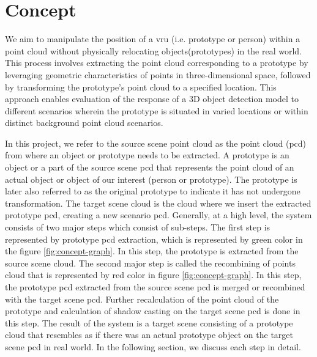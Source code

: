 \chapter{Concept}

We aim to manipulate the position of a \acrshort{vru} (i.e. prototype or person) within a point cloud without physically relocating objects(prototypes) in the real world. This process involves extracting the point cloud corresponding to a prototype by leveraging geometric characteristics of points in three-dimensional space, followed by transforming the prototype's point cloud to a specified location. This approach enables evaluation of the response of a 3D object detection model to different scenarios wherein the prototype is situated in varied locations or within distinct background point cloud scenarios.

In this project, we refer to the source scene point cloud as the point cloud (\acrshort{pcd}) from where an object or prototype needs to be extracted. A prototype is an object or a part of the source scene \acrshort{pcd} that represents the point cloud of an actual object or object of our interest (person or prototype). The prototype is later also referred to as the original prototype to indicate it has not undergone transformation. The target scene cloud is the cloud where we insert the extracted prototype \acrshort{pcd}, creating a new scenario \acrshort{pcd}. Generally, at a high level, the system consists of two major steps which consist of sub-steps. The first step is represented by prototype \acrshort{pcd} extraction, which is represented by green color in the figure \ref{fig:concept-graph}. In this step, the prototype is extracted from the source scene cloud. The second major step is called the recombining of points cloud that is represented by red color in figure \ref{fig:concept-graph}. In this step, the prototype \acrshort{pcd} extracted from the source scene \acrshort{pcd} is merged or recombined with the target scene \acrshort{pcd}. Further recalculation of the point cloud of the prototype and calculation of shadow casting on the target scene \acrshort{pcd} is done in this step. The result of the system is a target scene consisting of a prototype cloud that resembles as if there was an actual prototype object on the target scene \acrshort{pcd} in real world. In the following section, we discuss each step in detail.

